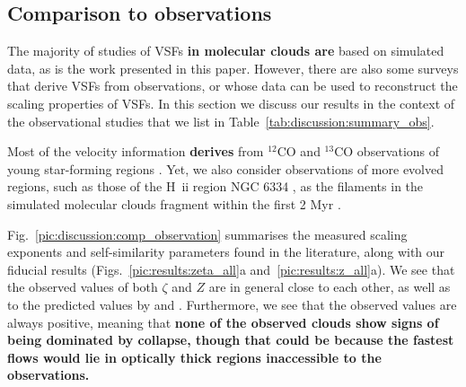 \subsection{Comparison to observations}\label{discussion:observation}


The majority of studies of VSFs \textbf{in molecular clouds are} based on simulated data, as is the work presented in this paper.
However, there are also some surveys that derive VSFs from observations, or whose data can be used to reconstruct the scaling properties of VSFs. 
In this section we discuss our results in the context of the observational studies that we list in Table~\ref{tab:discussion:summary_obs}.



Most of the velocity information \textbf{derives} from $^{12}$CO and $^{13}$CO observations of young star-forming regions \citep[e.g., Perseus and Taurus][]{Padoan2003}.
Yet, we also consider observations of more evolved regions, such as those of the H~{\sc ii} region NGC 6334 \citep{Zernickel2015}, as the filaments in the simulated molecular clouds fragment within the first 2 Myr .

Fig.~\ref{pic:discussion:comp_observation} summarises the measured scaling exponents and self-similarity parameters found in the literature, along with our fiducial results (Figs.~\ref{pic:results:zeta_all}a and~\ref{pic:results:z_all}a).
We see that the observed values of both $\zeta$ and $Z$ are in general close to each other, as well as to the predicted values by \citet{She1994} and \citet{Boldyrev2002}. 
Furthermore, we see that the observed values are always positive, meaning that \textbf{none of the observed clouds show signs of being dominated by collapse, though that could be because the fastest flows would lie in optically thick regions inaccessible to the observations.}  

